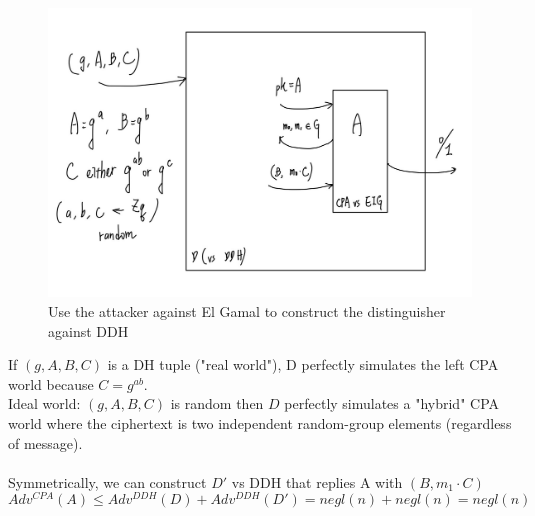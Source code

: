 \documentclass{scribe}
\begin{document}
\begin{figure}[H]
    \centering
    \includegraphics[scale=0.2]{elg.jpg}
    \caption{Use the attacker against El Gamal to construct the distinguisher against DDH}
\end{figure}
\noindent If $(g,A,B,C)$ is a DH tuple ("real world"), D perfectly simulates the left CPA world because $C=g^{ab}$.
\\
Ideal world: $(g,A,B,C)$ is random then $D$ perfectly simulates a "hybrid" CPA world where the ciphertext is two independent random-group elements (regardless of message).
\\
\\
Symmetrically, we can construct $D'$ vs DDH that replies A with $(B,m_1 \cdot C)$
\[Adv^{CPA}(A) \le Adv^{DDH}(D) + Adv^{DDH}(D') = negl(n)+negl(n) = negl(n)\]
\vspace{10mm}




%

\end{document}

